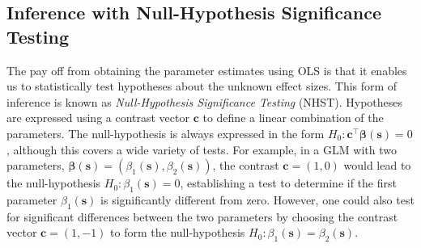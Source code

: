 \subsection{Inference with Null-Hypothesis Significance Testing}
\label{sec:NHST}
The pay off from obtaining the parameter estimates using OLS is that it enables us to statistically test hypotheses about the unknown effect sizes. This form of inference is known as \textit{Null-Hypothesis Significance Testing} (NHST). Hypotheses are expressed using a contrast vector $\bm{c}$ to define a linear combination of the parameters. The null-hypothesis is always expressed in the form $H_{0} : \bm{c}^{\intercal}\bm{\beta}(\bm{s}) = 0$, although this covers a wide variety of tests. For example, in a GLM with two parameters, $\bm{\beta}(\bm{s}) = (\beta_{1}(\bm{s}), \beta_{2}(\bm{s}))$, the contrast $\bm{c} = (1, 0)$ would lead to the null-hypothesis $H_{0} : \beta_{1}(\bm{s}) = 0$, establishing a test to determine if the first parameter $\beta_{1}(\bm{s})$ is significantly different from zero. However, one could also test for significant differences between the two parameters by choosing the contrast vector $\bm{c} = (1, -1)$ to form the null-hypothesis $H_{0} : \beta_{1}(\bm{s}) = \beta_{2}(\bm{s})$. 

